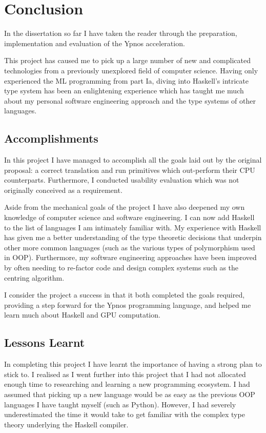 \documentclass[12pt,a4paper,oneside]{scrbook}
\begin{document}
\chapter{Conclusion}

In the dissertation so far I have taken the reader through the preparation,
implementation and evaluation of the Ypnos acceleration.

This project has caused me to pick up a large number of new and complicated
technologies from a previously unexplored field of computer science. Having only
experienced the ML programming from part Ia, diving into Haskell's intricate
type system has been an enlightening experience which has taught me much about
my personal software engineering approach and the type systems of other
languages.

\section{Accomplishments}

In this project I have managed to accomplish all the goals laid out by the
original proposal: a correct translation and run primitives which out-perform
their CPU counterparts. Furthermore, I conducted usability evaluation which was
not originally conceived as a requirement.

Aside from the mechanical goals of the project I have also deepened my own
knowledge of computer science and software engineering. I can now add Haskell to
the list of languages I am intimately familiar with. My experience with Haskell
has given me a better understanding of the type theoretic decisions that
underpin other more common languages (such as the various types of polymorphism
used in OOP). Furthermore, my software engineering approaches have been improved
by often needing to re-factor code and design complex systems such as the
centring algorithm.

I consider the project a success in that it both completed the goals required,
providing a step forward for the Ypnos programming language, and helped me learn
much about Haskell and GPU computation.

\section{Lessons Learnt}

In completing this project I have learnt the importance of having a strong plan
to stick to. I realised as I went further into this project that I had not
allocated enough time to researching and learning a new programming ecosystem. I
had assumed that picking up a new language would be as easy as the previous OOP
languages I have taught myself (such as Python). However, I had severely
underestimated the time it would take to get familiar with the complex type
theory underlying the Haskell compiler.
\end{document}
